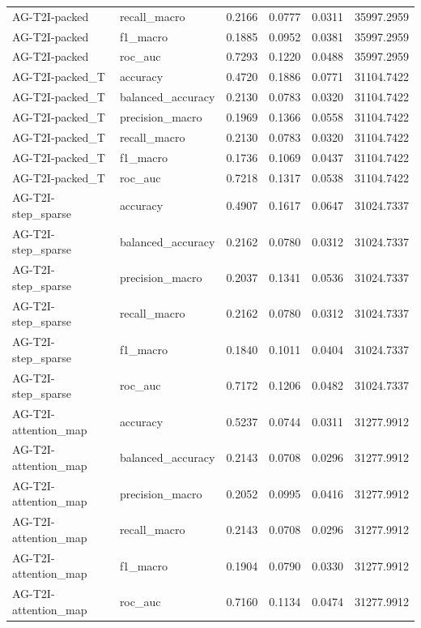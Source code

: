 \begin{tabular}{llrrrr}
AG-T2I-packed & recall_macro & 0.2166 & 0.0777 & 0.0311 & 35997.2959 \\
AG-T2I-packed & f1_macro & 0.1885 & 0.0952 & 0.0381 & 35997.2959 \\
AG-T2I-packed & roc_auc & 0.7293 & 0.1220 & 0.0488 & 35997.2959 \\
AG-T2I-packed_T & accuracy & 0.4720 & 0.1886 & 0.0771 & 31104.7422 \\
AG-T2I-packed_T & balanced_accuracy & 0.2130 & 0.0783 & 0.0320 & 31104.7422 \\
AG-T2I-packed_T & precision_macro & 0.1969 & 0.1366 & 0.0558 & 31104.7422 \\
AG-T2I-packed_T & recall_macro & 0.2130 & 0.0783 & 0.0320 & 31104.7422 \\
AG-T2I-packed_T & f1_macro & 0.1736 & 0.1069 & 0.0437 & 31104.7422 \\
AG-T2I-packed_T & roc_auc & 0.7218 & 0.1317 & 0.0538 & 31104.7422 \\
AG-T2I-step_sparse & accuracy & 0.4907 & 0.1617 & 0.0647 & 31024.7337 \\
AG-T2I-step_sparse & balanced_accuracy & 0.2162 & 0.0780 & 0.0312 & 31024.7337 \\
AG-T2I-step_sparse & precision_macro & 0.2037 & 0.1341 & 0.0536 & 31024.7337 \\
AG-T2I-step_sparse & recall_macro & 0.2162 & 0.0780 & 0.0312 & 31024.7337 \\
AG-T2I-step_sparse & f1_macro & 0.1840 & 0.1011 & 0.0404 & 31024.7337 \\
AG-T2I-step_sparse & roc_auc & 0.7172 & 0.1206 & 0.0482 & 31024.7337 \\
AG-T2I-attention_map & accuracy & 0.5237 & 0.0744 & 0.0311 & 31277.9912 \\
AG-T2I-attention_map & balanced_accuracy & 0.2143 & 0.0708 & 0.0296 & 31277.9912 \\
AG-T2I-attention_map & precision_macro & 0.2052 & 0.0995 & 0.0416 & 31277.9912 \\
AG-T2I-attention_map & recall_macro & 0.2143 & 0.0708 & 0.0296 & 31277.9912 \\
AG-T2I-attention_map & f1_macro & 0.1904 & 0.0790 & 0.0330 & 31277.9912 \\
AG-T2I-attention_map & roc_auc & 0.7160 & 0.1134 & 0.0474 & 31277.9912 \\
\bottomrule
\end{tabular}
